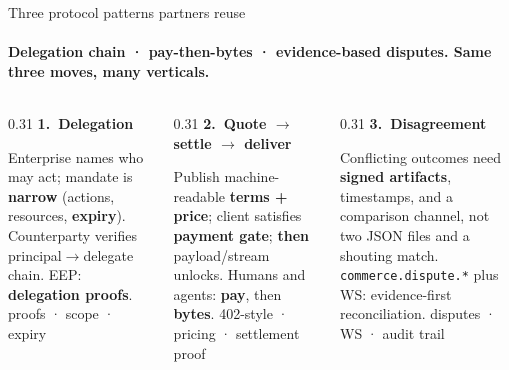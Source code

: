 \documentclass[aspectratio=169,10pt]{beamer}
\begin{document}
\begin{frame}[shrink=6]{Three protocol patterns partners reuse}
\framesubtitle{Delegation chain · pay-then-bytes · evidence-based disputes. Same three moves, many verticals.}

\vspace{0.08cm}
\begin{columns}[T,onlytextwidth]
\begin{column}{0.31\textwidth}
{\small\color{accent}\textbf{1.\ Delegation}}\par
\vspace{2pt}
{\scriptsize\color{txtm}%
Enterprise names who may act; mandate is \textbf{narrow} (actions, resources, \textbf{expiry}). Counterparty verifies principal$\rightarrow$delegate chain. EEP: \textbf{delegation proofs}.%
}
\vspace{2pt}
{\scriptsize\color{slate} proofs · scope · expiry}
\end{column}
\begin{column}{0.31\textwidth}
{\small\color{mint}\textbf{2.\ Quote $\rightarrow$ settle $\rightarrow$ deliver}}\par
\vspace{2pt}
{\scriptsize\color{txtm}%
Publish machine-readable \textbf{terms + price}; client satisfies \textbf{payment gate}; \textbf{then} payload/stream unlocks. Humans and agents: \textbf{pay}, then \textbf{bytes}.%
}
\vspace{2pt}
{\scriptsize\color{slate} 402-style · pricing · settlement proof}
\end{column}
\begin{column}{0.31\textwidth}
{\small\color{cyan}\textbf{3.\ Disagreement}}\par
\vspace{2pt}
{\scriptsize\color{txtm}%
Conflicting outcomes need \textbf{signed artifacts}, timestamps, and a comparison channel, not two JSON files and a shouting match. \texttt{commerce.dispute.*} plus WS: evidence-first reconciliation.%
}
\vspace{2pt}
{\scriptsize\color{slate} disputes · WS · audit trail}
\end{column}
\end{columns}
\end{frame}
\end{document}
